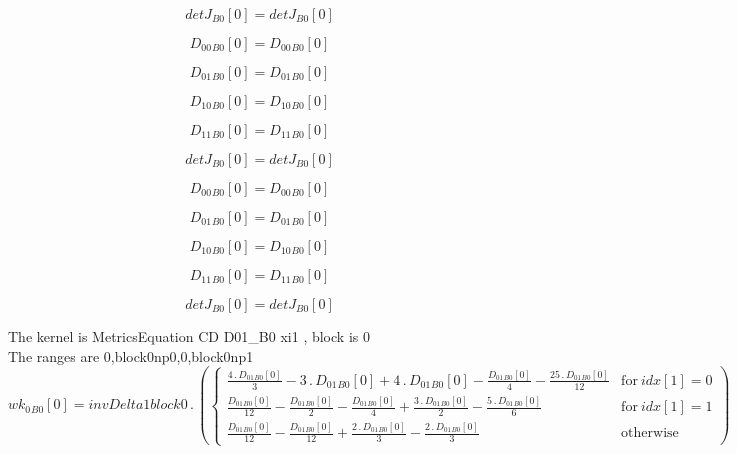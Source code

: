\documentclass{article}
\begin{document}
\begin{dmath}{detJ{_{B0}}}[{0}] = {detJ{_{B0}}}[{0}]\end{dmath}

\begin{dmath}{D_{00}{_{B0}}}[{0}] = {D_{00}{_{B0}}}[{0}]\end{dmath}

\begin{dmath}{D_{01}{_{B0}}}[{0}] = {D_{01}{_{B0}}}[{0}]\end{dmath}

\begin{dmath}{D_{10}{_{B0}}}[{0}] = {D_{10}{_{B0}}}[{0}]\end{dmath}

\begin{dmath}{D_{11}{_{B0}}}[{0}] = {D_{11}{_{B0}}}[{0}]\end{dmath}

\begin{dmath}{detJ{_{B0}}}[{0}] = {detJ{_{B0}}}[{0}]\end{dmath}

\begin{dmath}{D_{00}{_{B0}}}[{0}] = {D_{00}{_{B0}}}[{0}]\end{dmath}

\begin{dmath}{D_{01}{_{B0}}}[{0}] = {D_{01}{_{B0}}}[{0}]\end{dmath}

\begin{dmath}{D_{10}{_{B0}}}[{0}] = {D_{10}{_{B0}}}[{0}]\end{dmath}

\begin{dmath}{D_{11}{_{B0}}}[{0}] = {D_{11}{_{B0}}}[{0}]\end{dmath}

\begin{dmath}{detJ{_{B0}}}[{0}] = {detJ{_{B0}}}[{0}]\end{dmath}

\noindent The kernel is MetricsEquation CD D01_B0 xi1 , block is 0\\\noindent The ranges are 0,block0np0,0,block0np1\\\begin{dmath}{wk_{0}{_{B0}}}[{0}] = invDelta1block0 \,.\, \left(\begin{cases} \frac{4 \,.\, {D_{01}{_{B0}}}[{0}]}{3} - 3 \,.\, {D_{01}{_{B0}}}[{0}] + 4 \,.\, {D_{01}{_{B0}}}[{0}] - \frac{{D_{01}{_{B0}}}[{0}]}{4} - \frac{25 \,.\, 
{D_{01}{_{B0}}}[{0}]}{12} & \text{for}\: {idx}[{1}] = 0 \\\frac{{D_{01}{_{B0}}}[{0}]}{12} - \frac{{D_{01}{_{B0}}}[{0}]}{2} - \frac{{D_{01}{_{B0}}}[{0}]}{4} + \frac{3 \,.\, {D_{01}{_{B0}}}[{0}]}{2} - \frac{5 \,.\, {D_{01}{_{B0}}}[{0}]}{6} & 
\text{for}\: {idx}[{1}] = 1 \\\frac{{D_{01}{_{B0}}}[{0}]}{12} - \frac{{D_{01}{_{B0}}}[{0}]}{12} + \frac{2 \,.\, {D_{01}{_{B0}}}[{0}]}{3} - \frac{2 \,.\, {D_{01}{_{B0}}}[{0}]}{3} & \text{otherwise} \end{cases}\right)\end{dmath}
\end{document}
